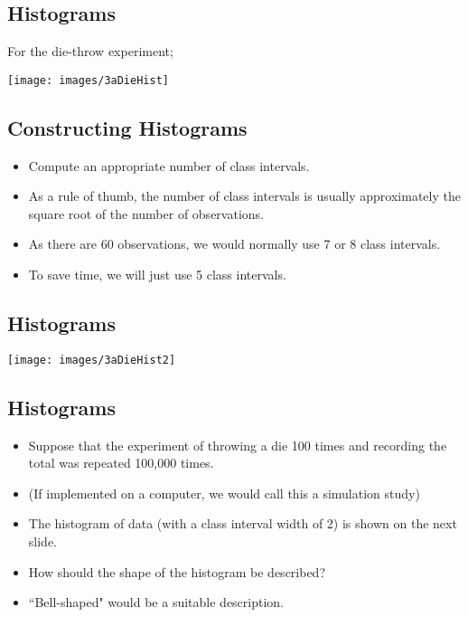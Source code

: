 \documentclass[]{report}
\begin{document}
{
\subsection{Histograms}
For the die-throw experiment;
\begin{center}
\texttt{[image: images/3aDieHist]}
\end{center}

}
{
\subsection{Constructing Histograms}
\begin{itemize}
\item Compute an appropriate number of class intervals.
\item As a rule of thumb, the number of class intervals is usually approximately the square root of the number of observations.
\item As there are 60 observations, we would normally use 7 or 8 class intervals.
\item To save time, we will just use 5 class intervals.
\end{itemize}

}



\subsection{Histograms}

\begin{center}
\texttt{[image: images/3aDieHist2]}
\end{center}



\subsection{Histograms}
\begin{itemize}
\item Suppose that the experiment of throwing a die 100 times and recording the total was repeated 100,000 times.
\item (If implemented on a computer, we would call this a simulation study)
\item The histogram of data (with a class interval width of 2) is shown on the next slide.
\item How should the shape of the histogram be described?
\item ``Bell-shaped" would be a suitable description.
\end{itemize}
\end{document}
